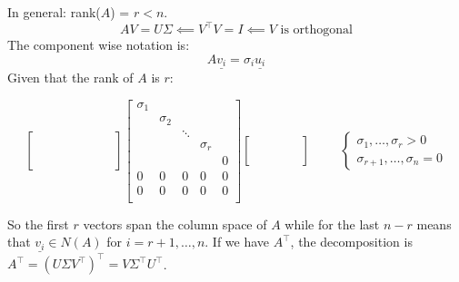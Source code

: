 In general: rank($A$) = $r < n$.
\[
    AV = U\Sigma \impliedby V^\intercal V = I \impliedby V \text{ is orthogonal}    
\]
The component wise notation is:
\[
    A\underline{v_i} = \sigma_i\underline{u_i}    
\]
Given that the rank of $A$ is $r$:

\[
\begin{bmatrix}
    & & & & & & &\\
    & & & & & & &\\
    & & & & & & &\\
    & & & & & & &\\
    & & & & & & &\\
    & & & & & & &\\
\end{bmatrix}
\begin{bmatrix}
    \sigma_1 & & & &\\
    & \sigma_2 & & &\\
    & & \ddots & &\\
    & & & \sigma_r &\\
    & & & & 0\\
    \hline
    0 & 0 & 0 & 0 & 0\\
    0 & 0 & 0 & 0 & 0\\
\end{bmatrix}
\begin{bmatrix}
    & & & & \\
    & & & & \\
    & & & & \\
    & & & & \\
\end{bmatrix}
\hspace{1cm}
\begin{cases}
\sigma_1, \dots, \sigma_r > 0\\
\sigma_{r+1}, \dots, \sigma_n = 0
\end{cases}  
\]

So the first $r$ vectors span the column space of $A$ while for the last $n-r$ means that $\underline{v_i} \in N(A)$ for $i = r+1, \dots, n$.
If we have $A^\intercal$, the decomposition is $A^\intercal = (U\Sigma V^\intercal)^\intercal = V\Sigma^\intercal U^\intercal$. 

